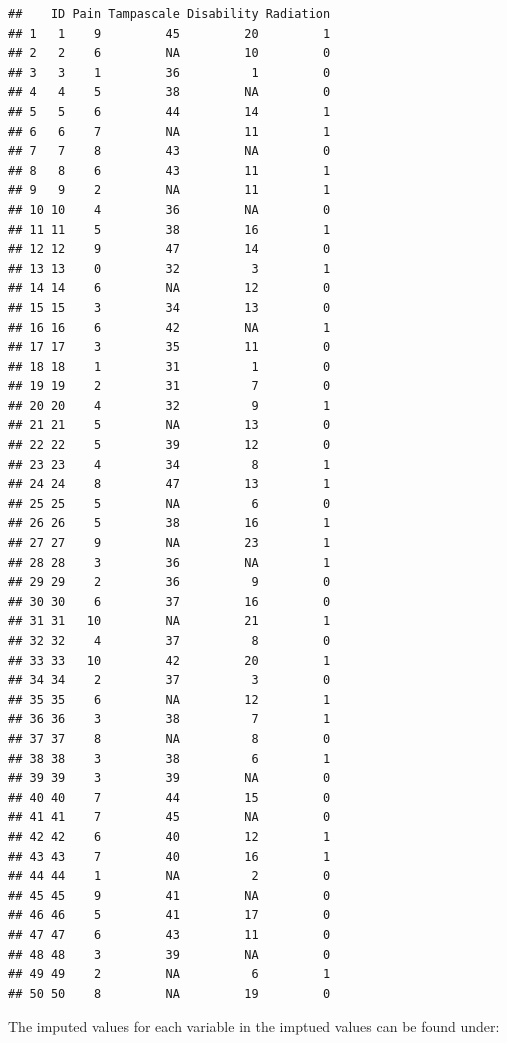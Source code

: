 \documentclass[]{book}
\begin{document}
\begin{verbatim}
##    ID Pain Tampascale Disability Radiation
## 1   1    9         45         20         1
## 2   2    6         NA         10         0
## 3   3    1         36          1         0
## 4   4    5         38         NA         0
## 5   5    6         44         14         1
## 6   6    7         NA         11         1
## 7   7    8         43         NA         0
## 8   8    6         43         11         1
## 9   9    2         NA         11         1
## 10 10    4         36         NA         0
## 11 11    5         38         16         1
## 12 12    9         47         14         0
## 13 13    0         32          3         1
## 14 14    6         NA         12         0
## 15 15    3         34         13         0
## 16 16    6         42         NA         1
## 17 17    3         35         11         0
## 18 18    1         31          1         0
## 19 19    2         31          7         0
## 20 20    4         32          9         1
## 21 21    5         NA         13         0
## 22 22    5         39         12         0
## 23 23    4         34          8         1
## 24 24    8         47         13         1
## 25 25    5         NA          6         0
## 26 26    5         38         16         1
## 27 27    9         NA         23         1
## 28 28    3         36         NA         1
## 29 29    2         36          9         0
## 30 30    6         37         16         0
## 31 31   10         NA         21         1
## 32 32    4         37          8         0
## 33 33   10         42         20         1
## 34 34    2         37          3         0
## 35 35    6         NA         12         1
## 36 36    3         38          7         1
## 37 37    8         NA          8         0
## 38 38    3         38          6         1
## 39 39    3         39         NA         0
## 40 40    7         44         15         0
## 41 41    7         45         NA         0
## 42 42    6         40         12         1
## 43 43    7         40         16         1
## 44 44    1         NA          2         0
## 45 45    9         41         NA         0
## 46 46    5         41         17         0
## 47 47    6         43         11         0
## 48 48    3         39         NA         0
## 49 49    2         NA          6         1
## 50 50    8         NA         19         0
\end{verbatim}

The imputed values for each variable in the imptued values can be found
under:
\end{document}
